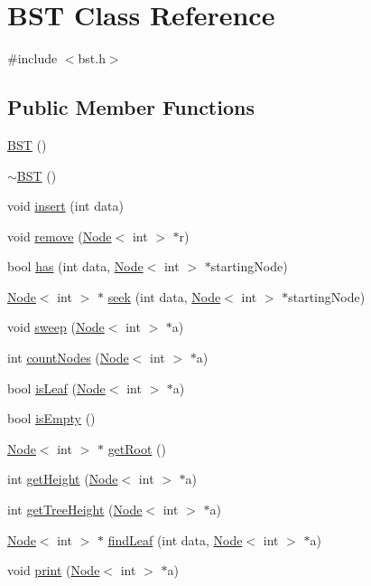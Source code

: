 \hypertarget{class_b_s_t}{}\section{B\+S\+T Class Reference}
\label{class_b_s_t}


{\ttfamily \#include $<$bst.\+h$>$}

\subsection*{Public Member Functions}
\begin{DoxyCompactItemize}
\item 
\hyperlink{class_b_s_t_abc17123a0367c3b8ad0382eeb3ad3178}{B\+S\+T} ()
\item 
\hyperlink{class_b_s_t_aff9c7948fbba37844d2893b920ddc238}{$\sim$\+B\+S\+T} ()
\item 
void \hyperlink{class_b_s_t_a01c0bd5499a27315e59a101448cddfe2}{insert} (int data)
\item 
void \hyperlink{class_b_s_t_a9240cccf72c1c1af9bd32897ddfe7f3a}{remove} (\hyperlink{classbstn_1_1_node}{Node}$<$ int $>$ $\ast$r)
\item 
bool \hyperlink{class_b_s_t_a32aed3e0a68a1c3f57980fbe733b7b2c}{has} (int data, \hyperlink{classbstn_1_1_node}{Node}$<$ int $>$ $\ast$starting\+Node)
\item 
\hyperlink{classbstn_1_1_node}{Node}$<$ int $>$ $\ast$ \hyperlink{class_b_s_t_af10050ecacfb81875af96130c83cb4b6}{seek} (int data, \hyperlink{classbstn_1_1_node}{Node}$<$ int $>$ $\ast$starting\+Node)
\item 
void \hyperlink{class_b_s_t_aedce2d74ced1e9ce38cb8679dceeb719}{sweep} (\hyperlink{classbstn_1_1_node}{Node}$<$ int $>$ $\ast$a)
\item 
int \hyperlink{class_b_s_t_aefecb9235457436598d503033df91810}{count\+Nodes} (\hyperlink{classbstn_1_1_node}{Node}$<$ int $>$ $\ast$a)
\item 
bool \hyperlink{class_b_s_t_a281e02698b3ce69272facb66f8b8f948}{is\+Leaf} (\hyperlink{classbstn_1_1_node}{Node}$<$ int $>$ $\ast$a)
\item 
bool \hyperlink{class_b_s_t_a3f490b624f24f2af60a5bd1fc253f4bf}{is\+Empty} ()
\item 
\hyperlink{classbstn_1_1_node}{Node}$<$ int $>$ $\ast$ \hyperlink{class_b_s_t_aaf5891e4a776292b24935526e3941fd2}{get\+Root} ()
\item 
int \hyperlink{class_b_s_t_abf7d02a3a336eed33eae7269eaf03c59}{get\+Height} (\hyperlink{classbstn_1_1_node}{Node}$<$ int $>$ $\ast$a)
\item 
int \hyperlink{class_b_s_t_a2c5db864f3d66b9c682d41c7e2dddff6}{get\+Tree\+Height} (\hyperlink{classbstn_1_1_node}{Node}$<$ int $>$ $\ast$a)
\item 
\hyperlink{classbstn_1_1_node}{Node}$<$ int $>$ $\ast$ \hyperlink{class_b_s_t_a82fccd83b94ef73c5817532e9b26af94}{find\+Leaf} (int data, \hyperlink{classbstn_1_1_node}{Node}$<$ int $>$ $\ast$a)
\item 
void \hyperlink{class_b_s_t_aff85f39ac3094a07b9199a9845df3764}{print} (\hyperlink{classbstn_1_1_node}{Node}$<$ int $>$ $\ast$a)
\end{DoxyCompactItemize}


